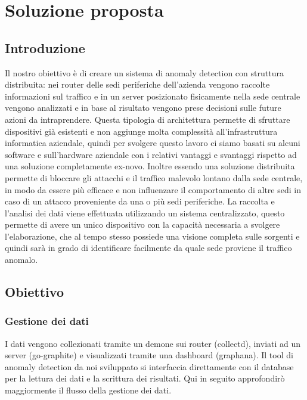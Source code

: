 \chapter{Soluzione proposta}

\section{Introduzione}
Il nostro obiettivo è di creare un sistema di anomaly detection con struttura distribuita: nei router delle sedi periferiche dell'azienda vengono raccolte informazioni sul traffico e in un server posizionato fisicamente nella sede centrale vengono analizzati e in base al risultato vengono prese decisioni sulle future azioni da intraprendere. Questa tipologia di architettura permette di sfruttare dispositivi già esistenti e non aggiunge molta complessità all'infrastruttura informatica aziendale, quindi per svolgere questo lavoro ci siamo basati su alcuni software e sull'hardware aziendale con i relativi vantaggi e svantaggi rispetto ad una soluzione completamente ex-novo.
Inoltre essendo una soluzione distribuita permette di bloccare gli attacchi e il traffico malevolo lontano dalla sede centrale, in modo da essere più efficace e non influenzare il comportamento di altre sedi in caso di un attacco proveniente da una o più sedi periferiche.
La raccolta e l'analisi dei dati viene effettuata utilizzando un sistema centralizzato, questo permette di avere un unico dispositivo con la capacità necessaria a svolgere l'elaborazione, che al tempo stesso possiede una visione completa sulle sorgenti e quindi sarà in grado di identificare facilmente da quale sede proviene il traffico anomalo.

\section{Obiettivo}

\subsection{Gestione dei dati}

I dati vengono collezionati tramite un demone sui router (collectd), inviati ad un server (go-graphite) e visualizzati tramite una dashboard (graphana). Il tool di anomaly detection da noi sviluppato si interfaccia direttamente con il database per la lettura dei dati e la scrittura dei risultati.
Qui in seguito approfondirò maggiormente il flusso della gestione dei dati.

